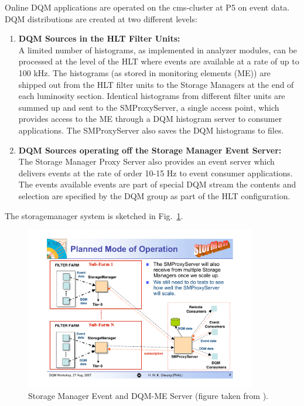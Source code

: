 
Online DQM applications are operated on the cms-cluster at P5 on event data. 
DQM distributions are created at two different levels:

\begin{enumerate}
\item {\bf DQM Sources in the HLT Filter Units:} \\
A limited number of histograms, as implemented in analyzer modules, can be processed at the level of the HLT where events are available at a rate of up to 100 kHz. The histograms (as stored in monitoring elements (ME)) are shipped out from the HLT filter units to the Storage Managers at the end of each luminosity section. Identical histograms from different filter units are summed up and sent to the SMProxyServer, a single access point, which provides access to the ME through a DQM histogram server to consumer applications. The SMProxyServer also saves the DQM histograms to files. 
\item {\bf DQM Sources operating off the Storage Manager Event Server:} \\
The Storage Manager Proxy Server also provides an event server which delivers events at the rate of order 10-15 Hz to event consumer applications. The events available events are part of special DQM stream the contents and selection are specified by the DQM group as part of the HLT configuration. 
\end{enumerate}
The storagemanager system is sketched in Fig.~\ref{fig:sm}.

\begin{figure}[!htbp]
\begin{center}
\includegraphics[width=0.9\textwidth]{SM}
\caption{Storage Manager Event and DQM-ME Server 
(figure taken from \cite{talk:harry}).}
\end{center}
\label{fig:sm}
\end{figure}

